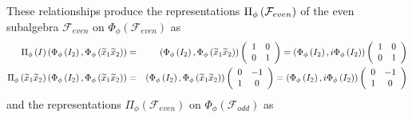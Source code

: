 \documentclass[aps,preprint]{revtex4}
\begin{document}
These relationships produce the representations $\Pi _{\phi }\left( \mathcal{%
F}_{even}\right) $ of the even subalgebra $\mathcal{F}_{even}$ on $\Phi
_{\phi }\left( \mathcal{F}_{even}\right) $ as 
\begin{eqnarray}
\Pi _{\phi }\left( I\right) \left( \Phi _{\phi }\left( I_{2}\right) ,\Phi
_{\phi }\left( \widetilde{x}_{1}\widetilde{x}_{2}\right) \right) &=&\left(
\Phi _{\phi }\left( I_{2}\right) ,\Phi _{\phi }\left( \widetilde{x}_{1}%
\widetilde{x}_{2}\right) \right) \left( 
\begin{array}{cc}
1 & 0 \\ 
0 & 1%
\end{array}%
\right) =\left( \Phi _{\phi }\left( I_{2}\right) ,i\Phi _{\phi }\left(
I_{2}\right) \right) \left( 
\begin{array}{cc}
1 & 0 \\ 
0 & 1%
\end{array}%
\right) \\
\Pi _{\phi }\left( \widetilde{x}_{1}\widetilde{x}_{2}\right) \left( \Phi
_{\phi }\left( I_{2}\right) ,\Phi _{\phi }\left( \widetilde{x}_{1}\widetilde{%
x}_{2}\right) \right) &=&\left( \Phi _{\phi }\left( I_{2}\right) ,\Phi
_{\phi }\left( \widetilde{x}_{1}\widetilde{x}_{2}\right) \right) \left( 
\begin{array}{cc}
0 & -1 \\ 
1 & 0%
\end{array}%
\right) =\left( \Phi _{\phi }\left( I_{2}\right) ,i\Phi _{\phi }\left(
I_{2}\right) \right) \left( 
\begin{array}{cc}
0 & -1 \\ 
1 & 0%
\end{array}%
\right)
\end{eqnarray}%
and the representations $\Pi _{\phi }\left( \mathcal{F}_{even}\right) $ on $%
\Phi _{\phi }\left( \mathcal{F}_{odd}\right) $ as%
\end{document}
